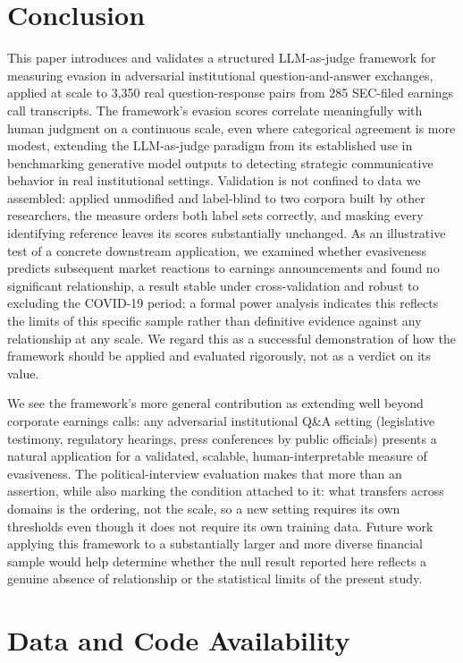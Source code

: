 \documentclass[conference]{IEEEtran}
\begin{document}
\section{Conclusion}

This paper introduces and validates a structured LLM-as-judge framework for measuring evasion in adversarial institutional question-and-answer exchanges, applied at scale to 3,350 real question-response pairs from 285 SEC-filed earnings call transcripts. The framework's evasion scores correlate meaningfully with human judgment on a continuous scale, even where categorical agreement is more modest, extending the LLM-as-judge paradigm from its established use in benchmarking generative model outputs to detecting strategic communicative behavior in real institutional settings. Validation is not confined to data we assembled: applied unmodified and label-blind to two corpora built by other researchers, the measure orders both label sets correctly, and masking every identifying reference leaves its scores substantially unchanged. As an illustrative test of a concrete downstream application, we examined whether evasiveness predicts subsequent market reactions to earnings announcements and found no significant relationship, a result stable under cross-validation and robust to excluding the COVID-19 period; a formal power analysis indicates this reflects the limits of this specific sample rather than definitive evidence against any relationship at any scale. We regard this as a successful demonstration of how the framework should be applied and evaluated rigorously, not as a verdict on its value.

We see the framework's more general contribution as extending well beyond corporate earnings calls: any adversarial institutional Q\&A setting (legislative testimony, regulatory hearings, press conferences by public officials) presents a natural application for a validated, scalable, human-interpretable measure of evasiveness. The political-interview evaluation makes that more than an assertion, while also marking the condition attached to it: what transfers across domains is the ordering, not the scale, so a new setting requires its own thresholds even though it does not require its own training data. Future work applying this framework to a substantially larger and more diverse financial sample would help determine whether the null result reported here reflects a genuine absence of relationship or the statistical limits of the present study.

\section*{Data and Code Availability}
\end{document}
